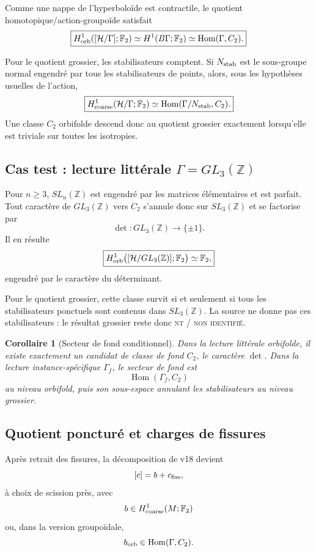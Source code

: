 \documentclass[11pt,a4paper]{article}
\newtheorem{corollary}[theorem]{Corollaire}
\newcommand{\statusNT}{\textsc{nt / non identifié}}
\begin{document}
Comme une nappe de l'hyperboloïde est contractile, le quotient homotopique/action-groupoïde satisfait
\[
 \boxed{
 H^1_{\rm orb}([\mathcal H/\Gamma];\mathbb F_2)
 \simeq
 H^1(B\Gamma;\mathbb F_2)
 \simeq
 \operatorname{Hom}(\Gamma,C_2).}
\]

Pour le quotient grossier, les stabilisateurs comptent. Si $N_{\rm stab}$ est le sous-groupe normal engendré par tous les stabilisateurs de points, alors, sous les hypothèses usuelles de l'action,
\[
 \boxed{
 H^1_{\rm coarse}(\mathcal H/\Gamma;\mathbb F_2)
 \simeq
 \operatorname{Hom}(\Gamma/N_{\rm stab},C_2).}
\]
Une classe $C_2$ orbifolde descend donc au quotient grossier exactement lorsqu'elle est triviale sur toutes les isotropies.

\subsection{Cas test : lecture littérale $\Gamma=GL_3(\mathbb Z)$}

Pour $n\ge3$, $SL_n(\mathbb Z)$ est engendré par les matrices élémentaires et est parfait. Tout caractère de $GL_3(\mathbb Z)$ vers $C_2$ s'annule donc sur $SL_3(\mathbb Z)$ et se factorise par
\[
 \det:
 GL_3(\mathbb Z)\to\{\pm1\}.
\]
Il en résulte
\[
 \boxed{
 H^1_{\rm orb}
 \bigl(
 [\mathcal H/GL_3(\mathbb Z)];
 \mathbb F_2
 \bigr)
 \simeq
 \mathbb F_2,}
\]
engendré par le caractère du déterminant.

Pour le quotient grossier, cette classe survit si et seulement si tous les stabilisateurs ponctuels sont contenus dans $SL_3(\mathbb Z)$. La source ne donne pas ces stabilisateurs : le résultat grossier reste donc \statusNT{}.

\begin{corollary}[Secteur de fond conditionnel]\label{cor:v20-background-H1}
Dans la lecture littérale orbifolde, il existe exactement un candidat de classe de fond $C_2$, le caractère $\det$. Dans la lecture instance-spécifique $\Gamma_f$, le secteur de fond est
\[
 \operatorname{Hom}(\Gamma_f,C_2)
\]
au niveau orbifold, puis son sous-espace annulant les stabilisateurs au niveau grossier.
\end{corollary}

\subsection{Quotient poncturé et charges de fissures}

Après retrait des fissures, la décomposition de v18 devient
\[
 [c]=b+c_{\rm fiss},
\]
à choix de scission près, avec
\[
 b\in H^1_{\rm coarse}(M;\mathbb F_2)
\]
ou, dans la version groupoïdale,
\[
 b_{\rm orb}\in\operatorname{Hom}(\Gamma,C_2).
\]
\end{document}
